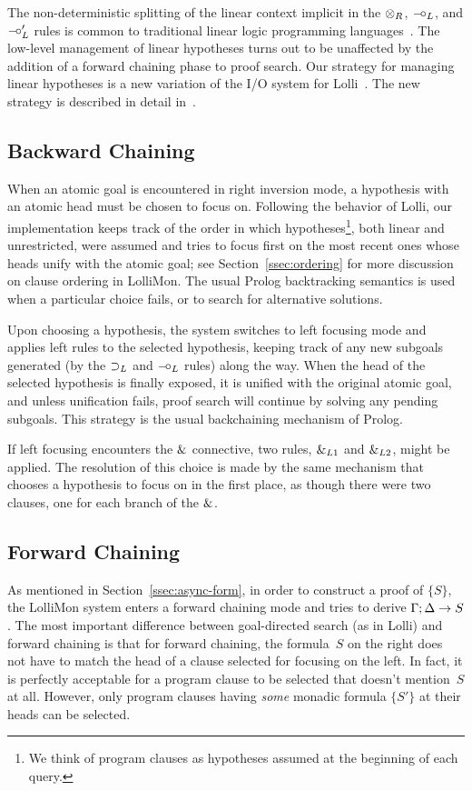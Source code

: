 \documentclass{sig-alt}
\begin{document}
The non-deterministic splitting of the linear context implicit in the
$\otimes_R$, $\mathbin{-\hspace{-0.70mm}\circ}_L$, and $\mathbin{-\hspace{-0.70mm}\circ}'_L$ rules
is common to traditional linear logic programming
languages~\cite{Hodas94ic,PymHarland94}.  The low-level management of
linear hypotheses turns out to be unaffected by the addition of a
forward chaining phase to proof search.  Our strategy for managing
linear hypotheses is a new variation of the I/O system for
Lolli~\cite{Hodas94ic}.  The new strategy is described in detail
in~\cite{LopPol05lpar}.

\subsection{Backward Chaining}
\label{ssec:bc}
When an atomic goal is encountered in right inversion mode,
a hypothesis with an atomic head must be chosen to focus on.
Following the behavior of Lolli, our implementation keeps track of the
order in which hypotheses\footnote{We think of program clauses as
  hypotheses assumed at the beginning of each query.}, both linear and
unrestricted, were assumed and tries to focus first on the most recent
ones whose heads unify with the atomic goal; see
Section~\ref{ssec:ordering} for more discussion on clause ordering in
LolliMon.  The usual Prolog backtracking semantics is used when a
particular choice fails, or to search for alternative solutions.

Upon choosing a hypothesis, the system switches to left
focusing mode and applies left rules to the selected
hypothesis, keeping track of any new subgoals generated (by the
$\supset_L$ and $\mathbin{-\hspace{-0.70mm}\circ}_L$ rules) along the way.  When the head of the
selected hypothesis is finally exposed, it is unified with the
original atomic goal, and unless unification fails, proof search will
continue by solving any pending subgoals.  This strategy is the usual
backchaining mechanism of Prolog.

If left focusing encounters the $\mathbin{\&}$ connective, 
two rules, $\mathbin{\&}_{L1}$ and $\mathbin{\&}_{L2}$, might be applied.
The resolution of this choice is made
by the same mechanism that chooses a hypothesis to focus on in the
first place, as though there were two clauses, one for each branch
of the $\mathbin{\&}$.

\subsection{Forward Chaining}
\label{ssec:forward}
As mentioned in Section~\ref{ssec:async-form}, in order to construct
a proof of $\{S\}$, the LolliMon system enters a forward chaining
mode and tries to derive $\Gamma;\Delta\rightarrow S$.
The most important difference
between goal-directed search (as in Lolli) and forward chaining is
that for forward chaining, the formula~$S$ on the right does not have
to match the head of a clause selected for focusing on the left.  In
fact, it is perfectly acceptable for a program clause to be selected
that doesn't mention~$S$ at all.  However, only program clauses having
\emph{some} monadic formula $\{S'\}$ at their heads can be selected.
\end{document}
